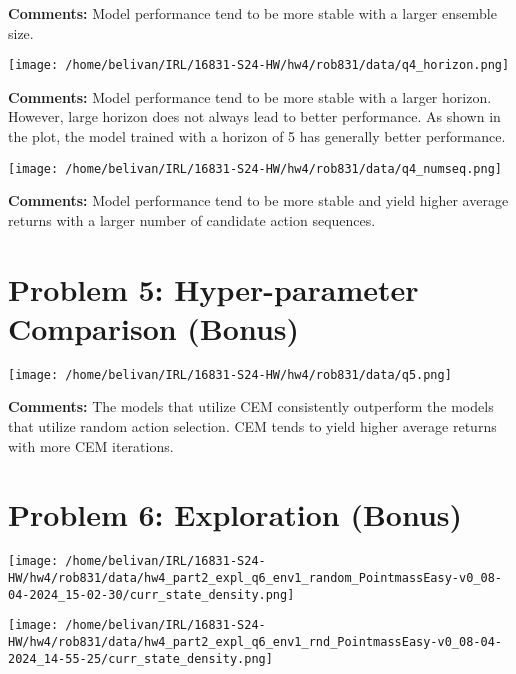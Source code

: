 \documentclass{article}
\begin{document}
\textbf{Comments:} Model performance tend to be more stable with a larger ensemble size. 

\begin{answer}[title=Plot,height=9.5cm,width=\linewidth]
\centering
\texttt{[image: /home/belivan/IRL/16831-S24-HW/hw4/rob831/data/q4\_horizon.png]}
\end{answer}

\textbf{Comments:} Model performance tend to be more stable with a larger horizon.
However, large horizon does not always lead to better performance.
As shown in the plot, the model trained with a horizon of 5 has generally better performance.

\begin{answer}[title=Plot,height=9.5cm,width=\linewidth]
\centering
\texttt{[image: /home/belivan/IRL/16831-S24-HW/hw4/rob831/data/q4\_numseq.png]}
\end{answer}

\textbf{Comments:} Model performance tend to be more stable and yield higher 
average returns with a larger number of candidate action sequences.


\section{Problem 5: Hyper-parameter Comparison (Bonus)}
\begin{answer}[title=Plot,height=9.5cm,width=\linewidth]
\centering
\texttt{[image: /home/belivan/IRL/16831-S24-HW/hw4/rob831/data/q5.png]}
\end{answer}

\textbf{Comments:} The models that utilize CEM consistently outperform the models that utilize random action selection.
CEM tends to yield higher average returns with more CEM iterations.


\section{Problem 6: Exploration (Bonus)}
\begin{answer}[title=Density Plot Pointmass Easy Random,height=9.5cm,width=\linewidth]
\centering
\texttt{[image: /home/belivan/IRL/16831-S24-HW/hw4/rob831/data/hw4\_part2\_expl\_q6\_env1\_random\_PointmassEasy-v0\_08-04-2024\_15-02-30/curr\_state\_density.png]}
\end{answer}

\begin{answer}[title=Density Plot Pointmass Easy RND,height=9.5cm,width=\linewidth]
\centering
\texttt{[image: /home/belivan/IRL/16831-S24-HW/hw4/rob831/data/hw4\_part2\_expl\_q6\_env1\_rnd\_PointmassEasy-v0\_08-04-2024\_14-55-25/curr\_state\_density.png]}
\end{answer}
\end{document}
